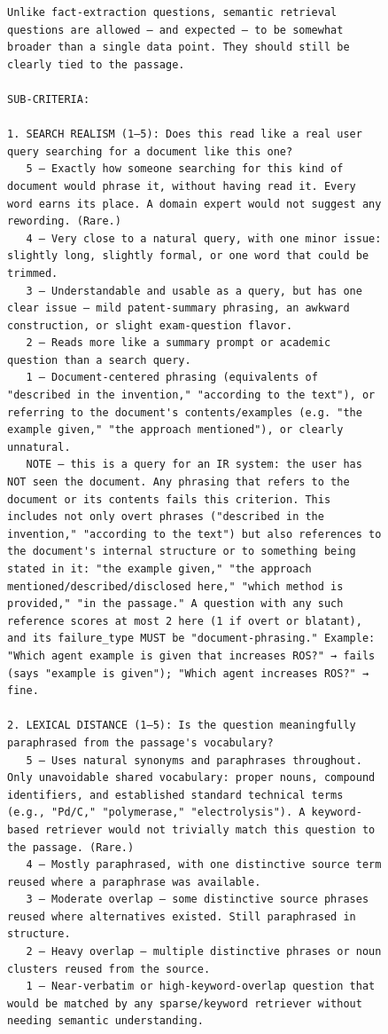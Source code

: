 \begin{figure}[h!]
\begin{minipage}{0.95\textwidth}
\begin{Verbatim}[breaklines=true, breakanywhere=true]
Unlike fact-extraction questions, semantic retrieval questions are allowed — and expected — to be somewhat broader than a single data point. They should still be clearly tied to the passage.

SUB-CRITERIA:

1. SEARCH REALISM (1–5): Does this read like a real user query searching for a document like this one?
   5 — Exactly how someone searching for this kind of document would phrase it, without having read it. Every word earns its place. A domain expert would not suggest any rewording. (Rare.)
   4 — Very close to a natural query, with one minor issue: slightly long, slightly formal, or one word that could be trimmed.
   3 — Understandable and usable as a query, but has one clear issue — mild patent-summary phrasing, an awkward construction, or slight exam-question flavor.
   2 — Reads more like a summary prompt or academic question than a search query.
   1 — Document-centered phrasing (equivalents of "described in the invention," "according to the text"), or referring to the document's contents/examples (e.g. "the example given," "the approach mentioned"), or clearly unnatural.
   NOTE — this is a query for an IR system: the user has NOT seen the document. Any phrasing that refers to the document or its contents fails this criterion. This includes not only overt phrases ("described in the invention," "according to the text") but also references to the document's internal structure or to something being stated in it: "the example given," "the approach mentioned/described/disclosed here," "which method is provided," "in the passage." A question with any such reference scores at most 2 here (1 if overt or blatant), and its failure_type MUST be "document-phrasing." Example: "Which agent example is given that increases ROS?" → fails (says "example is given"); "Which agent increases ROS?" → fine.

2. LEXICAL DISTANCE (1–5): Is the question meaningfully paraphrased from the passage's vocabulary?
   5 — Uses natural synonyms and paraphrases throughout. Only unavoidable shared vocabulary: proper nouns, compound identifiers, and established standard technical terms (e.g., "Pd/C," "polymerase," "electrolysis"). A keyword-based retriever would not trivially match this question to the passage. (Rare.)
   4 — Mostly paraphrased, with one distinctive source term reused where a paraphrase was available.
   3 — Moderate overlap — some distinctive source phrases reused where alternatives existed. Still paraphrased in structure.
   2 — Heavy overlap — multiple distinctive phrases or noun clusters reused from the source.
   1 — Near-verbatim or high-keyword-overlap question that would be matched by any sparse/keyword retriever without needing semantic understanding.


\end{Verbatim}
\end{minipage}
\end{figure}
